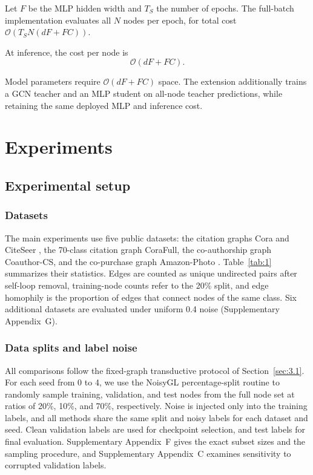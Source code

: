 \documentclass[times,review,10pt]{elsarticle}
\theoremstyle{definition}
\theoremstyle{plain}
\begin{document}
Let \(F\) be the MLP hidden width and \(T_S\) the number of epochs. The full-batch implementation evaluates all \(N\) nodes per epoch, for total cost \(\mathcal{O}(T_SN(dF+FC))\).\par
\noindent At inference, the cost per node is
\begin{equation}\label{eq:23}
\mathcal{O}(dF + FC).
\end{equation}

Model parameters require \(\mathcal{O}(dF+FC)\) space. The extension additionally trains a GCN teacher and an MLP student on all-node teacher predictions, while retaining the same deployed MLP and inference cost.
\section{Experiments}\label{sec:4}

\subsection{Experimental setup}\label{sec:4.1}

\subsubsection{Datasets}\label{sec:4.1.1}

The main experiments use five public datasets: the citation graphs Cora and CiteSeer \cite{ref69}, the 70-class citation graph CoraFull, the co-authorship graph Coauthor-CS, and the co-purchase graph Amazon-Photo \cite{ref70}. Table~\ref{tab:1} summarizes their statistics. Edges are counted as unique undirected pairs after self-loop removal, training-node counts refer to the 20\% split, and edge homophily is the proportion of edges that connect nodes of the same class. Six additional datasets are evaluated under uniform 0.4 noise (Supplementary Appendix~G).



\subsubsection{Data splits and label noise}\label{sec:4.1.2}

All comparisons follow the fixed-graph transductive protocol of Section~\ref{sec:3.1}. For each seed from 0 to 4, we use the NoisyGL percentage-split routine to randomly sample training, validation, and test nodes from the full node set at ratios of 20\%, 10\%, and 70\%, respectively. Noise is injected only into the training labels, and all methods share the same split and noisy labels for each dataset and seed. Clean validation labels are used for checkpoint selection, and test labels for final evaluation. Supplementary Appendix~F gives the exact subset sizes and the sampling procedure, and Supplementary Appendix~C examines sensitivity to corrupted validation labels.
\end{document}

